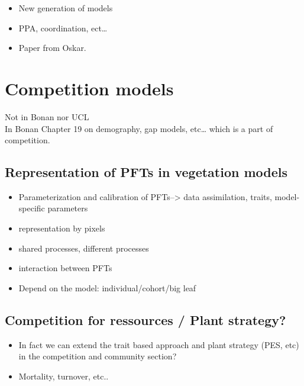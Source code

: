 \documentclass[
  oneside]{book}
\providecommand{\tightlist}{%
  \setlength{\itemsep}{0pt}\setlength{\parskip}{0pt}}
\begin{document}
\begin{itemize}
\tightlist
\item
  New generation of models
\item
  PPA, coordination, ect\ldots{}
\item
  Paper from Oskar.
\end{itemize}

\hypertarget{competition-models}{%
\section{Competition models}\label{competition-models}}

Not in Bonan nor UCL\\
In Bonan Chapter 19 on demography, gap models, etc\ldots{} which is a part of competition.

\hypertarget{representation-of-pfts-in-vegetation-models}{%
\subsection{Representation of PFTs in vegetation models}\label{representation-of-pfts-in-vegetation-models}}

\begin{itemize}
\tightlist
\item
  Parameterization and calibration of PFTs--\textgreater{} data assimilation, traits, model-specific parameters
\item
  representation by pixels
\item
  shared processes, different processes
\item
  interaction between PFTs
\item
  Depend on the model: individual/cohort/big leaf
\end{itemize}

\hypertarget{competition-for-ressources-plant-strategy}{%
\subsection{Competition for ressources / Plant strategy?}\label{competition-for-ressources-plant-strategy}}

\begin{itemize}
\tightlist
\item
  In fact we can extend the trait based approach and plant strategy (PES, etc)
  in the competition and community section?
\item
  Mortality, turnover, etc..
\end{itemize}
\end{document}
